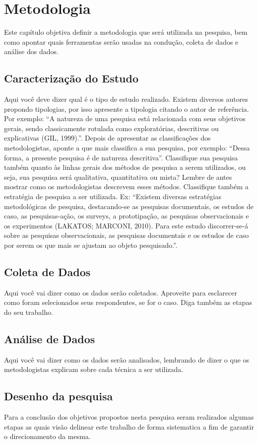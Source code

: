 \chapter{Metodologia}
Este capítulo objetiva definir a metodologia que será utilizada na pesquisa, bem como apontar quais ferramentas serão usadas na
condução, coleta de dados e análise dos dados.  
\section{Caracterização do Estudo}
Aqui você deve dizer qual é o tipo de estudo realizado. Existem diversos autores propondo tipologias, por isso apresente a tipologia citando o autor de referência. Por exemplo: “A natureza de uma pesquisa está relacionada com seus objetivos gerais, sendo classicamente rotulada como exploratórias, descritivas ou explicativas (GIL, 1999).”.
Depois de apresentar as classificações dos metodologistas, aponte a que mais classifica a sua pesquisa, por exemplo: “Dessa forma, a presente pesquisa é de natureza descritiva”.
Classifique sua pesquisa também quanto às linhas gerais dos métodos de pesquisa a serem utilizados, ou seja, sua pesquisa será qualitativa, quantitativa ou mista? Lembre de antes mostrar como os metodologistas descrevem esses métodos.
Classifique também a estratégia de pesquisa a ser utilizada. Ex: “Existem diversas estratégias metodológicas de pesquisa, destacando-se as pesquisas documentais, os estudos de caso, as pesquisas-ação, os surveys, a prototipação, as pesquisas observacionais e os experimentos (LAKATOS; MARCONI, 2010). Para este estudo discorrer-se-á sobre as pesquisas observacionais, as pesquisas documentais e os estudos de caso por serem os que mais se ajustam ao objeto pesquisado.”.  
\section{Coleta de Dados}
Aqui você vai dizer como os dados serão coletados. Aproveite para esclarecer como foram selecionados seus respondentes, se for o caso. Diga também as etapas do seu trabalho.
\section{Análise de Dados}
Aqui você vai dizer como os dados serão analisados, lembrando de dizer o que os metodologistas explicam sobre cada técnica a ser utilizada.
\section{Desenho da pesquisa}
Para a conclusão dos objetivos propostos nesta pesquisa seram realizados algumas etapas as quais visão delinear este trabalho de forma sistematica a fim de garantir o direcionamento da mesma. 

